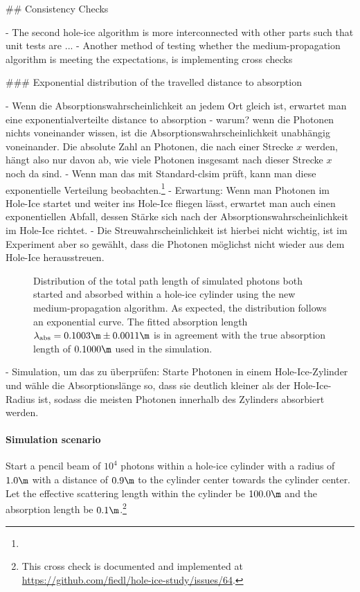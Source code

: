 
## Consistency Checks

- The second hole-ice algorithm is more interconnected with other parts such that unit tests are ...
- Another method of testing whether the medium-propagation algorithm is meeting the expectations, is implementing cross checks

### Exponential distribution of the travelled distance to absorption

- Wenn die Absorptionswahrscheinlichkeit an jedem Ort gleich ist, erwartet man eine exponentialverteilte distance to absorption
- warum? wenn die Photonen nichts voneinander wissen, ist die Absorptionswahrscheinlichkeit unabhängig voneinander. Die absolute Zahl an Photonen, die nach einer Strecke $x$ werden, hängt also nur davon ab, wie viele Photonen insgesamt nach dieser Strecke $x$ noch da sind.
- Wenn man das mit Standard-clsim prüft, kann man diese exponentielle Verteilung beobachten.\footnote{}
- Erwartung: Wenn man Photonen im Hole-Ice startet und weiter ins Hole-Ice fliegen lässt, erwartet man auch einen exponentiellen Abfall, dessen Stärke sich nach der Absorptionswahrscheinlichkeit im Hole-Ice richtet.
- Die Streuwahrscheinlichkeit ist hierbei nicht wichtig, ist im Experiment aber so gewählt, dass die Photonen möglichst nicht wieder aus dem Hole-Ice herausstreuen.

\begin{figure}
  \caption{Distribution of the total path length of simulated photons both started and absorbed within a hole-ice cylinder using the new medium-propagation algorithm. As expected, the distribution follows an exponential curve. The fitted absorption length $\lambda_\text{abs}=0.1003\m \pm 0.0011\m$ is in agreement with the true absorption length of $0.1000\m$ used in the simulation.}
\end{figure}

- Simulation, um das zu überprüfen: Starte Photonen in einem Hole-Ice-Zylinder und wähle die Absorptionslänge so, dass sie deutlich kleiner als der Hole-Ice-Radius ist, sodass die meisten Photonen innerhalb des Zylinders absorbiert werden.

\paragraph{Simulation scenario} Start a pencil beam of $10^4$ photons within a hole-ice cylinder with a radius of $1.0\m$ with a distance of $0.9\m$ to the cylinder center towards the cylinder center. Let the effective scattering length within the cylinder be $100.0\m$ and the absorption length be $0.1\m$.\footnote{This cross check is documented and implemented at \url{https://github.com/fiedl/hole-ice-study/issues/64}.}


